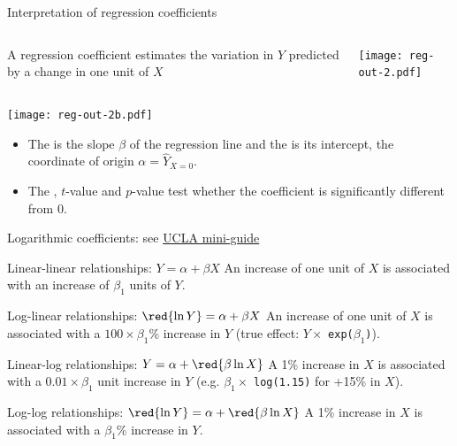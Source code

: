 \documentclass[t]{beamer}
\begin{document}
	\begin{frame}[t]{Interpretation of regression coefficients}

	\begin{columns}[T]


	A regression coefficient estimates the variation in $Y$ predicted by a change in one unit of $X$ \color{gray}{(recall that $Y = \alpha + \beta X + \epsilon$)}

		\texttt{[image: reg-out-2.pdf]}\vspace{1cm}
	\end{columns}

	\vspace{-1em}
	\texttt{[image: reg-out-2b.pdf]}%

	\begin{itemize}
		\item The  is the slope $\beta$ of the regression line and the  is its intercept, the coordinate of origin $\alpha = \hat{Y}_{X=0}$.

		\item The , $t$-value and $p$-value test whether the coefficient is significantly different from $0$.
	\end{itemize}

	\end{frame}

	\begin{frame}[c]{Logarithmic coefficients: see \href{http://www.ats.ucla.edu/stat/mult_pkg/faq/general/log_transformed_regression.htm}{UCLA mini-guide}}
	
		\begin{block}{Linear-linear relationships: $Y = \alpha + \beta X$}
			An increase of one unit of $X$ is associated with an increase of $\beta_1$ units of $Y$.
		\end{block}
	
		\begin{block}{Log-linear relationships: $\red{\ln Y} = \alpha + \beta X$}
			An increase of one unit of $X$ is associated with a $100 \times \beta_1$\% increase in $Y$ (true effect: $Y \times$ \texttt{exp($\beta_1$)}).
		\end{block}

		\begin{block}{Linear-log relationships: $Y = \alpha + \red{\beta \ln X}$}
			A 1\% increase in $X$ is associated with a $0.01 \times \beta_1$ unit increase in $Y$ (e.g. $\beta_1 \times$ \texttt{log(1.15)} for +15\% in $X$).
		\end{block}
	
		\begin{block}{Log-log relationships: $\red{\ln Y} = \alpha + \red{\beta \ln X}$}
			A 1\% increase in $X$ is associated with a $\beta_1$\% increase in $Y$.
		\end{block}
	
	\end{frame}
	
\end{document}
